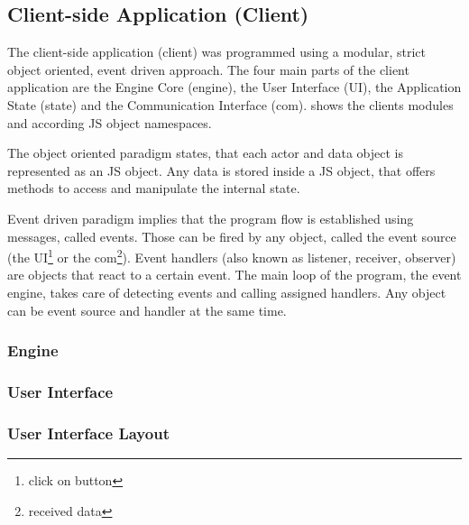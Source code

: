 \subsection{Client-side Application (Client)}
\label{sec:client}

The client-side application (client) was programmed using a modular, strict object oriented, event driven approach.
The four main parts of the client application are the Engine Core (engine), the User Interface (UI), the Application State (state) and the Communication Interface (com).
 shows the clients modules and according JS object namespaces.


The object oriented paradigm states, that each actor and data object is represented as an JS object.
Any data is stored inside a JS object, that offers methods to access and manipulate the internal state.

Event driven paradigm implies that the program flow is established using messages, called events.
Those can be fired by any object, called the event source (the UI\footnote{click on button} or the com\footnote{received data}).
Event handlers (also known as listener, receiver, observer) are objects that react to a certain event.
The main loop of the program, the event engine, takes care of detecting events and calling assigned handlers.
Any object can be event source and handler at the same time.


\subsubsection{Engine}



\subsubsection{User Interface}


\subsubsection{User Interface Layout}




